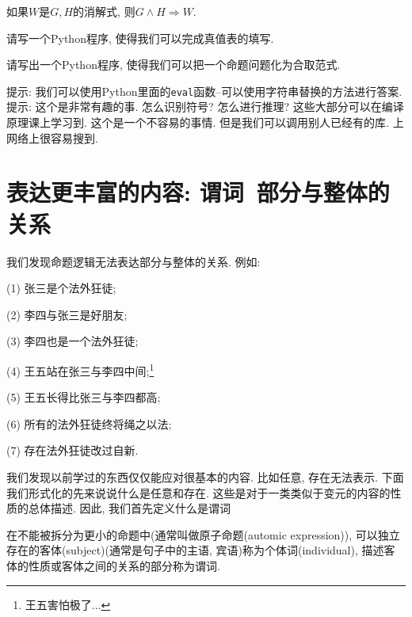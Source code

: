 \begin{theorem}
	如果$W$是$G,H$的消解式, 则$G\land H\Rightarrow W$. 
\end{theorem}

\begin{Exercise}\label{ex:proplogic2}

\Question 请写一个Python程序, 使得我们可以完成真值表的填写. 

\Question 请写出一个Python程序, 使得我们可以把一个命题问题化为合取范式. 
\end{Exercise}

\begin{multicols}{2}

	\begin{Answer}[ref={ex:proplogic2}]
		\Question 提示: 我们可以使用Python里面的\texttt{eval}函数--可以使用字符串替换的方法进行答案. 
		\Question 提示: 这个是非常有趣的事. 怎么识别符号? 怎么进行推理? 这些大部分可以在编译原理课上学习到. 这个是一个不容易的事情. 但是我们可以调用别人已经有的库. 上网络上很容易搜到.  
	\end{Answer}
	
\end{multicols}


\section{表达更丰富的内容: 谓词~部分与整体的关系}

我们发现命题逻辑无法表达部分与整体的关系. 例如: 

\begin{example}
	(1) 张三是个法外狂徒; 
	
	(2) 李四与张三是好朋友;
	
	(3) 李四也是一个法外狂徒;
	
	(4) 王五站在张三与李四中间;\footnote{王五害怕极了...} 
	
	(5) 王五长得比张三与李四都高;
	
	(6) 所有的法外狂徒终将绳之以法;
	
	(7) 存在法外狂徒改过自新. 
\end{example}


我们发现以前学过的东西仅仅能应对很基本的内容. 比如任意, 存在无法表示. 下面我们形式化的先来说说什么是任意和存在. 这些是对于一类类似于变元的内容的性质的总体描述. 因此,  我们首先定义什么是谓词

\begin{definition}[谓词(predicate)]
	在不能被拆分为更小的命题中(通常叫做原子命题(automic expression)), 可以独立存在的客体(subject)(通常是句子中的主语, 宾语)称为个体词(individual), 描述客体的性质或客体之间的关系的部分称为谓词. 
\end{definition}

